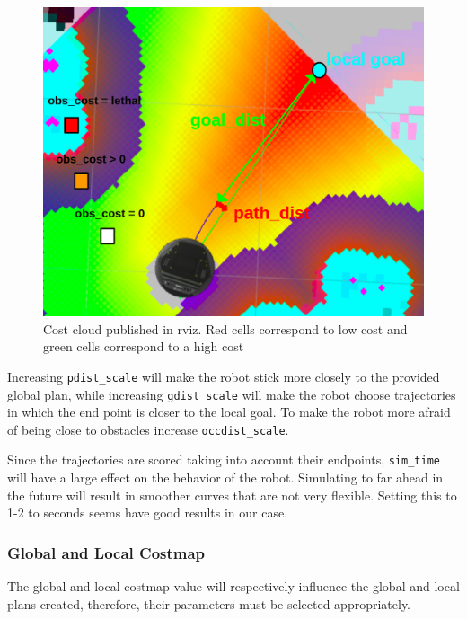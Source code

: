 \documentclass[12pt]{article}
\begin{document}
\begin{figure}[!htb]
    \centering
    \includegraphics[scale=0.3]{cost_cloud.png}
    \caption{Cost cloud published in rviz. Red cells correspond to low cost and green cells correspond to a high cost}
    \label{fig:cost_cloud}
\end{figure}


Increasing \texttt{pdist\_scale} will make the robot stick more closely to the provided global plan, while increasing \texttt{gdist\_scale} will make the robot choose trajectories in which the end point is closer to the local goal. To make the robot more afraid of being close to obstacles increase \texttt{occdist\_scale}.

Since the trajectories are scored taking into account their endpoints, \texttt{sim\_time} will have a large effect on the behavior of the robot. Simulating to far ahead in the future  will result in smoother curves that are not very flexible. Setting this to 1-2 to seconds seems have good results in our case.

\subsubsection{Global and Local Costmap}
The global and local costmap value will respectively influence the global and local plans created, therefore, their parameters must be selected appropriately.
\end{document}
